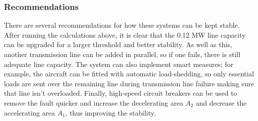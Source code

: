         \subsubsection*{Recommendations}
            There are several recommendations for how these systems can be kept stable. After running the calculations above, it is clear that the 0.12 MW line capacity can be upgraded for a larger threshold and better stability. As well as this, another transmission line can be added in parallel, so if one fails, there is still adequate line capacity. The system can also implement smart measures; for example, the aircraft can be fitted with automatic load-shedding, so only essential loads are sent over the remaining line during transmission line failure making sure that line isn't overloaded. Finally, high-speed circuit breakers can be used to remove the fault quicker and increase the decelerating area \(A_2\) and decrease the accelerating area \(A_1\), thus improving the stability.
            
